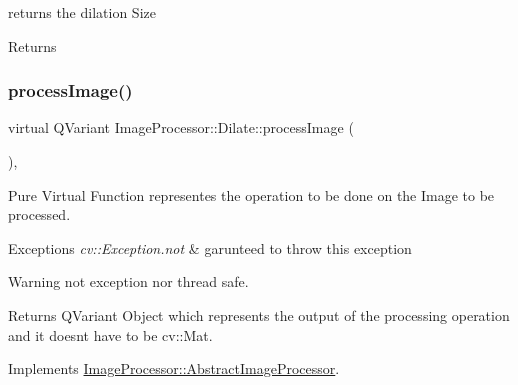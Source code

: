 returns the dilation Size 

\begin{DoxyReturn}{Returns}

\end{DoxyReturn}
\mbox{\label{class_image_processor_1_1_dilate_a47c84e673efe4a1280eede2ea9cb4ef9}} 
\subsubsection{\texorpdfstring{process\+Image()}{processImage()}\hspace{0.1cm}{\footnotesize\ttfamily [1/2]}}
{\footnotesize\ttfamily virtual Q\+Variant Image\+Processor\+::\+Dilate\+::process\+Image (\begin{DoxyParamCaption}{ }\end{DoxyParamCaption})\hspace{0.3cm}{\ttfamily [override]}, {\ttfamily [virtual]}}



Pure Virtual Function representes the operation to be done on the Image to be processed. 


\begin{DoxyExceptions}{Exceptions}
{\em cv\+::\+Exception.\+not} & garunteed to throw this exception \\
\hline
\end{DoxyExceptions}
\begin{DoxyWarning}{Warning}
not exception nor thread safe. 
\end{DoxyWarning}
\begin{DoxyReturn}{Returns}
Q\+Variant Object which represents the output of the processing operation and it doesn\textquotesingle{}t have to be cv\+::\+Mat. 
\end{DoxyReturn}


Implements \hyperlink{class_image_processor_1_1_abstract_image_processor_ad033ae911918b0f6842b7b1d6cdd2b90}{Image\+Processor\+::\+Abstract\+Image\+Processor}.

\mbox{\label{class_image_processor_1_1_dilate_ac4af4d83e97990416f1ccc6b80fd140b}} 

